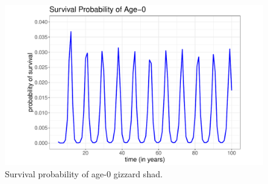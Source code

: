 \documentclass[preprint,review,12pt,authoryear]{elsarticle}
\begin{document}
\begin{figure}
\centering
  \includegraphics[width=.4\textwidth]{figures/Figure2a.pdf}
   \caption{}
  \label{fig:age0time}
\caption{Survival probability of age-0 gizzard shad.}
\end{figure}    
\end{document}
